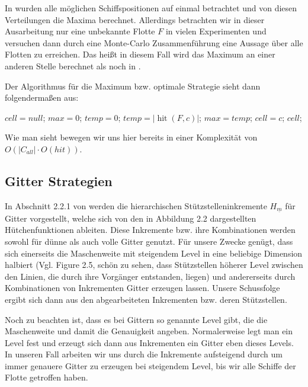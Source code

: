 \documentclass[a4paper,12pt]{llncs}
\numberwithin{equation}{section}
\DeclareMathOperator{\hit}{hit}
\begin{document}
In \cite{M13} wurden alle möglichen Schiffspositionen auf einmal betrachtet und von diesen Verteilungen die Maxima berechnet. Allerdings betrachten wir in dieser Ausarbeitung nur eine unbekannte Flotte $F$ in vielen Experimenten und versuchen dann durch eine Monte-Carlo Zusammenführung eine Aussage über alle Flotten zu erreichen. Das heißt in diesem Fall wird das Maximum an einer anderen Stelle berechnet als noch in \cite{M13}. 

Der Algorithmus für die Maximum bzw. optimale Strategie sieht dann folgendermaßen aus:

\begin{tcolorbox}
	\begin{algorithmic}
		\State $cell = null$;
		\State $max = 0$;
		\State $temp = 0$;
		\State $temp=\left|\hit(F,c)\right|$;
		\State $max=temp$;
		\State $cell = c$;
		\EndIf
		\EndFor
		\State \Return $cell$;
		\EndFunction
	\end{algorithmic}
\end{tcolorbox}

Wie man sieht bewegen wir uns hier bereits in einer Komplexität von $O(\left|C_{all}\right|\cdot O(hit))$. %

\subsection{Gitter Strategien}

In Abschnitt 2.2.1 von \cite{M13} werden die hierarchischen Stützstelleninkremente $H_{\underline{m}}$ für Gitter vorgestellt, welche sich von den in \cite{M13} Abbildung 2.2 dargestellten Hütchenfunktionen ableiten. Diese Inkremente bzw. ihre Kombinationen werden sowohl für dünne als auch volle Gitter genutzt. Für unsere Zwecke genügt, dass sich einerseits die Maschenweite mit steigendem Level in eine beliebige Dimension halbiert (Vgl. \cite{P10} Figure 2.5, schön zu sehen, dass Stützstellen höherer Level zwischen den Linien, die durch ihre Vorgänger entstanden, liegen) und andererseits durch Kombinationen von Inkrementen Gitter erzeugen lassen. Unsere Schussfolge ergibt sich dann aus den abgearbeiteten Inkrementen bzw. deren Stützstellen. 

Noch zu beachten ist, dass es bei Gittern so genannte Level gibt, die die Maschenweite und damit die Genauigkeit angeben. Normalerweise legt man ein Level fest und erzeugt sich dann aus Inkrementen ein Gitter eben dieses Levels. In unseren Fall arbeiten wir uns durch die Inkremente aufsteigend durch um immer genauere Gitter zu erzeugen bei steigendem Level, bis wir alle Schiffe der Flotte getroffen haben.
\end{document}
